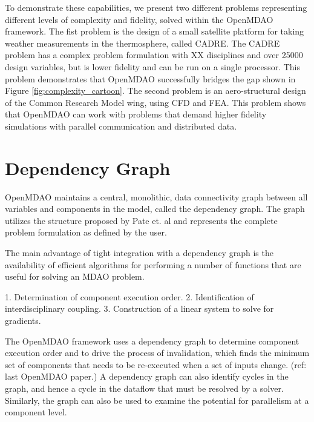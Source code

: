 \documentclass[]{aiaa-tc} %
\begin{document}
    To demonstrate these capabilities, we present two different problems representing different levels of 
    complexity and fidelity, solved within the OpenMDAO framework. The fist problem is the design of a small 
    satellite platform for taking weather measurements in the thermosphere, called CADRE. The CADRE problem has a 
    complex problem formulation with XX disciplines and over 25000 design variables, but is lower fidelity and can 
    be run on a single processor. This problem demonstrates that OpenMDAO successfully bridges the gap shown 
    in Figure \ref{fig:complexity_cartoon}. The second problem is an aero-structural design of the Common Research 
    Model wing, using CFD and FEA. This problem shows that OpenMDAO can work with problems that demand higher fidelity 
    simulations with parallel communication and distributed data. 

  \section{Dependency Graph}

    OpenMDAO maintains a central, monolithic, data connectivity graph between all 
    variables and components in the model, called the dependency graph. The graph utilizes the structure proposed by 
    Pate et. al \cite{graph_problem2013} and represents the complete problem formulation as 
    defined by the user. 

    The main advantage of tight integration with a dependency graph is the availability of efficient
    algorithms for performing a number of functions that are useful for solving an MDAO problem.

      1. Determination of component execution order.
      2. Identification of interdisciplinary coupling.
      3. Construction of a linear system to solve for gradients.
      
    The OpenMDAO framework uses a dependency graph to determine component execution order and to
    drive the process of invalidation, which finds the minimum set of components that needs to
    be re-executed when a set of inputs change. (ref: last OpenMDAO paper.) A dependency graph
    can also identify cycles in the graph, and hence a cycle in the dataflow that must be resolved
    by a solver. Similarly, the graph can also be used to examine the potential for parallelism at
    a component level.
\end{document}
